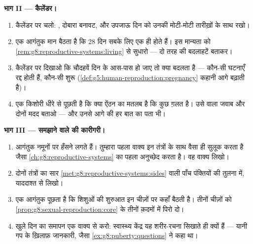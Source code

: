 \begin{problem}
\medskip\noindent\textbf{भाग II --- कैलेंडर।}
\begin{enumerate}[resume]
  \item कैलेंडर पर चलो: , दोबारा बनावट,  और उपजाऊ
        दिन को उनकी मोटी-मोटी तारीख़ों के साथ रखो।
  \item एक आगंतुक मान बैठता है कि 28 दिन सबके लिए एक ही होते हैं। इस
        मान्यता को \cref{rem:g8:reproductive-systems:living} से
        सुधारो --- दो तरह की बदलाहटें बताकर।
  \item कैलेंडर पर दिखाओ कि चौदहवें दिन के आस-पास  हो जाए तो
        क्या बदलता है --- कौन-सी घटनाएँ रद्द होती हैं, कौन-सी शुरू
        (\cref{def:g5:human-reproduction:pregnancy} कहानी आगे बढ़ाती
        है)।
  \item एक किशोरी धीरे से पूछती है कि क्या ऐंठन का मतलब है कि कुछ
        ग़लत है। उसे  वाला जवाब और दोनों मदद बताओ --- और उनसे आगे
        की हर बात का पता भी।
\end{enumerate}

\medskip\noindent\textbf{भाग III --- समझाने वाले की कारीगरी।}
\begin{enumerate}[resume]
  \item आगंतुक नमूनों पर हँसने लगते हैं। तुम्हारा पहला वाक्य इन
        तंत्रों के साथ वैसा ही सुलूक करता है जैसा
        \cref{ch:g8:reproductive-systems} का पहला अनुच्छेद करता है।
        वह वाक्य लिखो।
  \item दोनों तंत्रों का सार
        \cref{met:g8:reproductive-systems:sides} वाली पाँच पंक्तियों
        की तुलना में, याददाश्त से लिखो।
  \item एक आगंतुक पूछता है कि शिशुओं की शुरुआत इन चीज़ों पर कहाँ बैठती
        है। तीनों चीज़ों को
        \cref{prop:g8:sexual-reproduction:core} के तीनों क़दमों में
        पिरो दो।
  \item खुले दिन का समापन एक वाक्य से करो: स्वास्थ्य केंद्र यह
        शरीर-रचना सिखाते ही क्यों हैं --- यानी गप के ख़िलाफ़ जानकारी,
        जैसा \cref{ex:g8:puberty:questions} ने कहा था।
\end{enumerate}
\end{problem}
